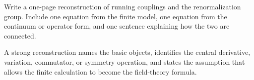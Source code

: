\begin{exercise}
Write a one-page reconstruction of running couplings and the renormalization group.  Include one equation from the finite model, one equation from the continuum or operator form, and one sentence explaining how the two are connected.
\begin{answer}
A strong reconstruction names the basic objects, identifies the central derivative, variation, commutator, or symmetry operation, and states the assumption that allows the finite calculation to become the field-theory formula.
\end{answer}
\end{exercise}
